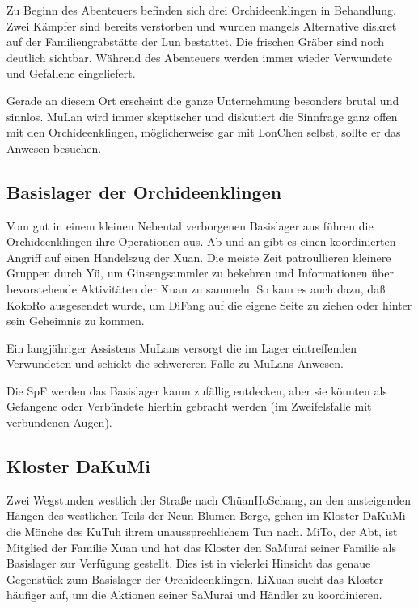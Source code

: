 \documentclass[
a4paper,
twoside,
DIV=calc,
BCOR=4mm,
fontsize=9pt,
twocolumn=on,
titlepage=on,
parskip=half
]{scrartcl}
\begin{document}
Zu Beginn des Abenteuers befinden sich drei Orchideenklingen in
Behandlung. Zwei Kämpfer sind bereits verstorben und wurden mangels
Alternative diskret auf der Familiengrabstätte der Lun bestattet. Die
frischen Gräber sind noch deutlich sichtbar. Während des Abenteuers
werden immer wieder Verwundete und Gefallene eingeliefert.

Gerade an diesem Ort erscheint die ganze Unternehmung besonders brutal
und sinnlos. MuLan wird immer skeptischer und diskutiert die Sinnfrage
ganz offen mit den Orchideenklingen, möglicherweise gar mit LonChen
selbst, sollte er das Anwesen besuchen.

\subsection{Basislager der Orchideenklingen}

Vom gut in einem kleinen Nebental verborgenen Basislager aus führen
die Orchideenklingen ihre Operationen aus. Ab und an gibt es einen
koordinierten Angriff auf einen Handelszug der Xuan. Die meiste Zeit
patroullieren kleinere Gruppen durch Yü, um Ginsengsammler zu bekehren
und Informationen über bevorstehende Aktivitäten der Xuan zu
sammeln. So kam es auch dazu, daß KokoRo ausgesendet wurde, um DiFang
auf die eigene Seite zu ziehen oder hinter sein Geheimnis zu kommen.

Ein langjähriger Assistens MuLans versorgt die im Lager eintreffenden
Verwundeten und schickt die schwereren Fälle zu MuLans Anwesen.

Die SpF werden das Basislager kaum zufällig entdecken, aber sie
könnten als Gefangene oder Verbündete hierhin gebracht werden (im
Zweifelsfalle mit verbundenen Augen).

\subsection{Kloster DaKuMi}

Zwei Wegstunden westlich der Straße nach ChüanHoSchang, an den
ansteigenden Hängen des westlichen Teils der Neun-Blumen-Berge, gehen
im Kloster DaKuMi die Mönche des KuTuh ihrem unaussprechlichem Tun
nach. MiTo, der Abt, ist Mitglied der Familie Xuan und hat das Kloster
den SaMurai seiner Familie als Basislager zur Verfügung gestellt. Dies
ist in vielerlei Hinsicht das genaue Gegenstück zum Basislager der
Orchideenklingen. LiXuan sucht das Kloster häufiger auf, um die
Aktionen seiner SaMurai und Händler zu koordinieren.
\end{document}

